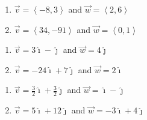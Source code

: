 \begin{multicols}{2} 

\begin{enumerate}

\setcounter{enumi}{\value{HW}}

\item $\vec{v} = \left\langle -8, 3 \right\rangle$ and $\vec{w} = \left\langle 2, 6 \right\rangle$
\item $\vec{v} = \left\langle 34, -91 \right\rangle$ and $\vec{w} = \left\langle 0, 1 \right\rangle$

\setcounter{HW}{\value{enumi}}

\end{enumerate}

\end{multicols}

\begin{multicols}{2} 

\begin{enumerate}

\setcounter{enumi}{\value{HW}}

\item $\vec{v} =3\hat{\imath} - \hat{\jmath}$ and $\vec{w} = 4\hat{\jmath}$
\item $\vec{v} = -24\hat{\imath} + 7\hat{\jmath} $ and $\vec{w} = 2\hat{\imath}$

\setcounter{HW}{\value{enumi}}

\end{enumerate}

\end{multicols}

\begin{multicols}{2} 

\begin{enumerate}

\setcounter{enumi}{\value{HW}}

\item $\vec{v} =\frac{3}{2} \hat{\imath} + \frac{3}{2} \hat{\jmath}$ and $\vec{w} = \hat{\imath} - \hat{\jmath}$
\item $\vec{v} = 5\hat{\imath} +12\hat{\jmath}$ and $\vec{w} = -3\hat{\imath} + 4\hat{\jmath} $

\setcounter{HW}{\value{enumi}}

\end{enumerate}

\end{multicols}

